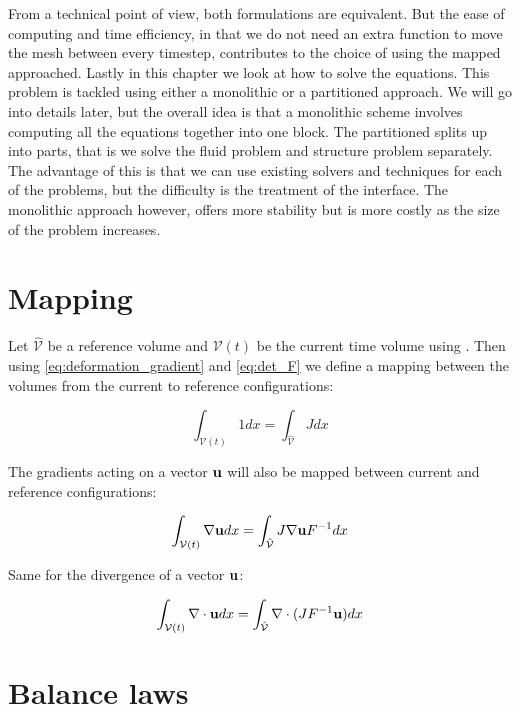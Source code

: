 From a technical point of view, both formulations are equivalent.\cite{Richter2016} But the ease of computing and time efficiency, in that we do not need an extra function to move the mesh between every timestep, contributes to the choice of using the mapped approached.
Lastly in this chapter we look at how to solve the equations. This problem is tackled using either a monolithic or a partitioned approach. We will go into details later, but the overall idea is that a monolithic scheme involves computing all the equations together into one block. The partitioned splits up into parts, that is we solve the fluid problem and structure problem separately. The advantage of this is that we can use existing solvers and techniques for each of the problems, but the difficulty is the treatment of the interface. The monolithic approach however, offers more stability but is more costly as the size of the problem increases\cite{Liu2014}.



\section{Mapping}
Let $\hat{\mathcal{V}}$ be a reference volume and $\mathcal{V}(t)$ be the current time volume using \cite{Richter}. Then using \eqref{eq:deformation_gradient} and \eqref{eq:det_F} we define a mapping between the volumes from the current to reference configurations:

\begin{equation}
 \int_{\mathcal{V}(t)} 1  dx = \int_{\hat{\mathcal{V}}} J dx  
\end{equation}

The gradients acting on a vector $ \bold{u} $ will also be mapped between current and reference configurations:

\begin{equation}
\int_{\mathcal{V}(t)} \nabla \bold{u}   dx = \int_{\hat{\mathcal{V}}} J  \nabla \bold{u}F^{-1} dx  
\end{equation}

Same for the divergence of a vector $ \bold{u}$:

\begin{equation}
\int_{\mathcal{V}(t)} \nabla \cdot \bold{u}   dx = \int_{\hat{\mathcal{V}}} \nabla \cdot( J  F^{-1} \bold{u}) dx  
\end{equation}

\section{Balance laws}

